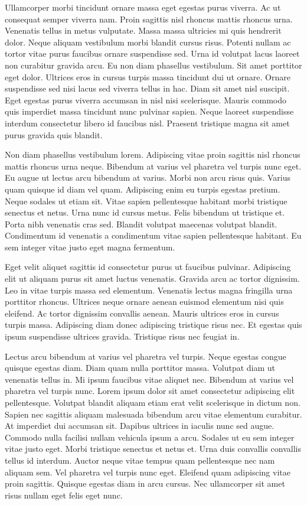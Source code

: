 \documentclass[11pt,a4paper]{article}
\begin{document}
Ullamcorper morbi tincidunt ornare massa eget egestas purus viverra. Ac ut consequat semper viverra nam. Proin sagittis nisl rhoncus mattis rhoncus urna. Venenatis tellus in metus vulputate. Massa massa ultricies mi quis hendrerit dolor. Neque aliquam vestibulum morbi blandit cursus risus. Potenti nullam ac tortor vitae purus faucibus ornare suspendisse sed. Urna id volutpat lacus laoreet non curabitur gravida arcu. Eu non diam phasellus vestibulum. Sit amet porttitor eget dolor. Ultrices eros in cursus turpis massa tincidunt dui ut ornare. Ornare suspendisse sed nisi lacus sed viverra tellus in hac. Diam sit amet nisl suscipit. Eget egestas purus viverra accumsan in nisl nisi scelerisque. Mauris commodo quis imperdiet massa tincidunt nunc pulvinar sapien. Neque laoreet suspendisse interdum consectetur libero id faucibus nisl. Praesent tristique magna sit amet purus gravida quis blandit.

Non diam phasellus vestibulum lorem. Adipiscing vitae proin sagittis nisl rhoncus mattis rhoncus urna neque. Bibendum at varius vel pharetra vel turpis nunc eget. Eu augue ut lectus arcu bibendum at varius. Morbi non arcu risus quis. Varius quam quisque id diam vel quam. Adipiscing enim eu turpis egestas pretium. Neque sodales ut etiam sit. Vitae sapien pellentesque habitant morbi tristique senectus et netus. Urna nunc id cursus metus. Felis bibendum ut tristique et. Porta nibh venenatis cras sed. Blandit volutpat maecenas volutpat blandit. Condimentum id venenatis a condimentum vitae sapien pellentesque habitant. Eu sem integer vitae justo eget magna fermentum.

Eget velit aliquet sagittis id consectetur purus ut faucibus pulvinar. Adipiscing elit ut aliquam purus sit amet luctus venenatis. Gravida arcu ac tortor dignissim. Leo in vitae turpis massa sed elementum. Venenatis lectus magna fringilla urna porttitor rhoncus. Ultrices neque ornare aenean euismod elementum nisi quis eleifend. Ac tortor dignissim convallis aenean. Mauris ultrices eros in cursus turpis massa. Adipiscing diam donec adipiscing tristique risus nec. Et egestas quis ipsum suspendisse ultrices gravida. Tristique risus nec feugiat in.

Lectus arcu bibendum at varius vel pharetra vel turpis. Neque egestas congue quisque egestas diam. Diam quam nulla porttitor massa. Volutpat diam ut venenatis tellus in. Mi ipsum faucibus vitae aliquet nec. Bibendum at varius vel pharetra vel turpis nunc. Lorem ipsum dolor sit amet consectetur adipiscing elit pellentesque. Volutpat blandit aliquam etiam erat velit scelerisque in dictum non. Sapien nec sagittis aliquam malesuada bibendum arcu vitae elementum curabitur. At imperdiet dui accumsan sit. Dapibus ultrices in iaculis nunc sed augue. Commodo nulla facilisi nullam vehicula ipsum a arcu. Sodales ut eu sem integer vitae justo eget. Morbi tristique senectus et netus et. Urna duis convallis convallis tellus id interdum. Auctor neque vitae tempus quam pellentesque nec nam aliquam sem. Vel pharetra vel turpis nunc eget. Eleifend quam adipiscing vitae proin sagittis. Quisque egestas diam in arcu cursus. Nec ullamcorper sit amet risus nullam eget felis eget nunc.
\end{document}
